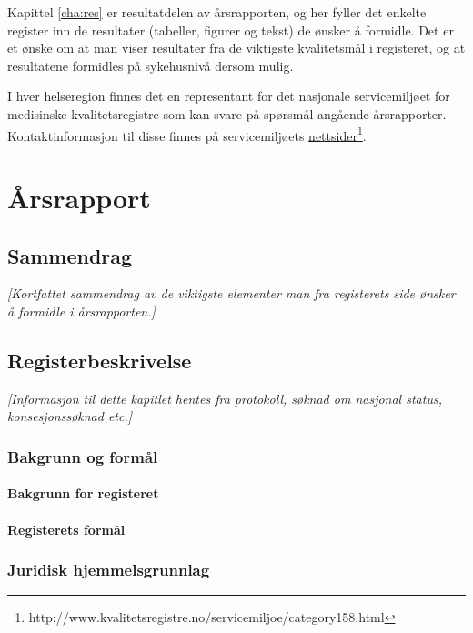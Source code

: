\documentclass[norsk, a4paper, twocolumn]{report}
\newcommand{\guide}[1] {
	\textit{[\textcolor{guidegray}{#1}]}
	}
\begin{document}
Kapittel \ref{cha:res} er resultatdelen av årsrapporten, og her fyller det
enkelte
register inn de resultater (tabeller, figurer og tekst) de ønsker å formidle.
Det er et ønske om at man viser resultater fra de viktigste kvalitetsmål i
registeret, og at resultatene formidles på sykehusnivå dersom
mulig.

I hver helseregion finnes det en representant for det nasjonale servicemiljøet
for medisinske kvalitetsregistre som kan svare på spørsmål angående
årsrapporter. Kontaktinformasjon til disse finnes på
servicemiljøets \href{http://www.kvalitetsregistre.no/servicemiljoe/category158.html}{nettsider}\footnote{http://www.kvalitetsregistre.no/servicemiljoe/category158.html}.



\tableofcontents
\part{Årsrapport}\label{par:rap}

\twocolumn

\chapter{Sammendrag}
\guide{Kortfattet sammendrag av de viktigste elementer man fra registerets side ønsker å formidle i årsrapporten.}


\chapter{Registerbeskrivelse}\label{cha:reg}
\guide{Informasjon til dette kapitlet hentes fra protokoll, søknad om nasjonal status, konsesjonssøknad etc.}


\section{Bakgrunn og formål}
\subsection{Bakgrunn for registeret}\label{sec:bak}
\subsection{Registerets formål}\label{sec:for}

\section{Juridisk hjemmelsgrunnlag}\label{cha:jur}
\end{document}
